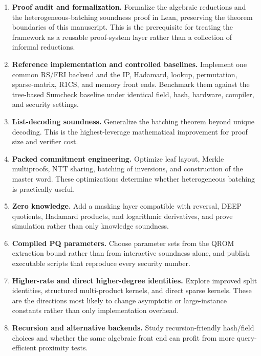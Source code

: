 \begin{enumerate}[label=\textbf{R\arabic*.},leftmargin=*]
  \item \textbf{Proof audit and formalization.}
  Formalize the algebraic reductions and the heterogeneous-batching soundness proof in Lean, preserving the theorem boundaries of this manuscript.  This is the prerequisite for treating the framework as a reusable proof-system layer rather than a collection of informal reductions.

  \item \textbf{Reference implementation and controlled baselines.}
  Implement one common RS/FRI backend and the IP, Hadamard, lookup, permutation, sparse-matrix, R1CS, and memory front ends.  Benchmark them against the tree-based Sumcheck baseline under identical field, hash, hardware, compiler, and security settings.

  \item \textbf{List-decoding soundness.}
  Generalize the batching theorem beyond unique decoding.  This is the highest-leverage mathematical improvement for proof size and verifier cost.

  \item \textbf{Packed commitment engineering.}
  Optimize leaf layout, Merkle multiproofs, NTT sharing, batching of inversions, and construction of the master word.  These optimizations determine whether heterogeneous batching is practically useful.

  \item \textbf{Zero knowledge.}
  Add a masking layer compatible with reversal, DEEP quotients, Hadamard products, and logarithmic derivatives, and prove simulation rather than only knowledge soundness.

  \item \textbf{Compiled PQ parameters.}
  Choose parameter sets from the QROM extraction bound rather than from interactive soundness alone, and publish executable scripts that reproduce every security number.

  \item \textbf{Higher-rate and direct higher-degree identities.}
  Explore improved split identities, structured multi-product kernels, and direct sparse kernels.  These are the directions most likely to change asymptotic or large-instance constants rather than only implementation overhead.

  \item \textbf{Recursion and alternative backends.}
  Study recursion-friendly hash/field choices and whether the same algebraic front end can profit from more query-efficient proximity tests.
\end{enumerate}

